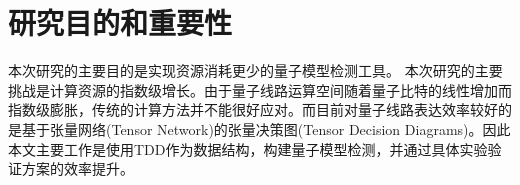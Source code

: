 

\section{研究目的和重要性}
本次研究的主要目的是实现资源消耗更少的量子模型检测工具。
本次研究的主要挑战是计算资源的指数级增长。由于量子线路运算空间随着量子比特的线性增加而指数级膨胀，传统的计算方法并不能很好应对。而目前对量子线路表达效率较好的是基于张量网络(Tensor Network)的张量决策图(Tensor Decision Diagrams)。因此本文主要工作是使用TDD作为数据结构，构建量子模型检测，并通过具体实验验证方案的效率提升。


